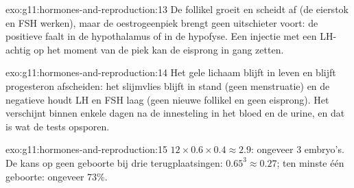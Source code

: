 \begin{solution}{exo:g11:hormones-and-reproduction:13}
De follikel groeit en scheidt af (de eierstok en FSH werken), maar de
oestrogeenpiek brengt geen uitschieter voort: de positieve 
faalt in de hypothalamus of in de hypofyse. Een injectie met een
LH-achtig  op het moment van de piek kan de eisprong in gang
zetten.
\end{solution}

\begin{solution}{exo:g11:hormones-and-reproduction:14}
Het gele lichaam blijft in leven en blijft progesteron afscheiden: het
slijmvlies blijft in stand (geen menstruatie) en de negatieve
 houdt LH en FSH laag (geen nieuwe follikel en geen
eisprong). Het  verschijnt binnen enkele dagen na de innesteling
in het bloed en de urine, en dat is wat de tests opsporen.
\end{solution}

\begin{solution}{exo:g11:hormones-and-reproduction:15}
$12 \times 0.6 \times 0.4 \approx 2.9$: ongeveer 3 embryo's. De kans op
geen geboorte bij drie terugplaatsingen: $0.65^3 \approx 0.27$; ten minste
één geboorte: ongeveer 73\%.
\end{solution}

